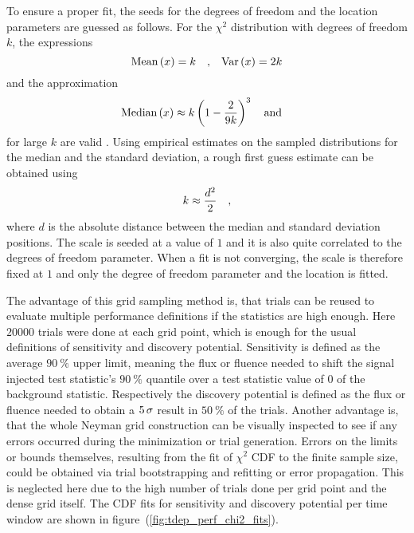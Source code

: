 To ensure a proper fit, the seeds for the degrees of freedom and the location parameters are guessed as follows.
For the $\chi^2$ distribution with degrees of freedom $k$, the expressions
\begin{equation}
  \text{Mean}\,(x) = k \quad\text{,}\quad
  \text{Var}\,(x) = 2k
\end{equation}
and the approximation
\begin{equation}
    \text{Median}\,(x) \approx k \left(1 - \frac{2}{9k}\right)^3 \quad\text{and}\quad
\end{equation}
for large $k$ are valid \cite{blobel2013statistische,Abramowitz:1974handbook}.
Using empirical estimates on the sampled distributions for the median and the standard deviation, a rough first guess estimate can be obtained using
\begin{equation}
  k \approx \frac{d^2}{2}
  \quad\text{,}
\end{equation}
where $d$ is the absolute distance between the median and standard deviation positions.
The scale is seeded at a value of $1$ and it is also quite correlated to the degrees of freedom parameter.
When a fit is not converging, the scale is therefore fixed at $1$ and only the degree of freedom parameter and the location is fitted.

The advantage of this grid sampling method is, that trials can be reused to evaluate multiple performance definitions if the statistics are high enough.
Here $\num{20000}$ trials were done at each grid point, which is enough for the usual definitions of sensitivity and discovery potential.
Sensitivity is defined as the average $\SI{90}{\percent}$ upper limit, meaning the flux or fluence needed to shift the signal injected test statistic's $\SI{90}{\percent}$ quantile over a test statistic value of $0$ of the background statistic.
Respectively the discovery potential is defined as the flux or fluence needed to obtain a $\num{5}\,\sigma$ result in $\SI{50}{\percent}$ of the trials.
Another advantage is, that the whole Neyman grid construction can be visually inspected to see if any errors occurred during the minimization or trial generation.
Errors on the limits or bounds themselves, resulting from the fit of $\chi^2$ CDF to the finite sample size, could be obtained via trial bootstrapping and refitting or error propagation.
This is neglected here due to the high number of trials done per grid point and the dense grid itself.
The CDF fits for sensitivity and discovery potential per time window are shown in figure~(\ref{fig:tdep_perf_chi2_fits}).

